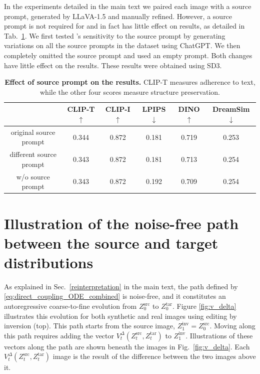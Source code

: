 In the experiments detailed in the main text we paired each image with a source prompt, generated by LLaVA-1.5 and manually refined. However, a source prompt is not required for \ours{} and in fact has little effect on \ours{} results, as detailed in Tab.~\ref{tab:src_prompt}. 
We first tested \ours{}'s sensitivity to the source prompt by generating variations on all the source prompts in the dataset using ChatGPT. We then completely omitted the source prompt and used an empty prompt. Both changes have little effect on the results. These results were obtained using SD3. 

\begin{table}[h]
\centering
\caption{\textbf{Effect of source prompt on the results.} CLIP-T measures adherence to text, while the other four scores measure structure preservation.}
\label{tab:src_prompt}
\begin{tabular}{@{}c|c|cccc@{}}
\toprule
 & CLIP-T $\uparrow$ & CLIP-I $\uparrow$ & LPIPS $\downarrow$ & DINO $\uparrow$ & DreamSim $\downarrow$ \\ \midrule
original source prompt & 0.344 & 0.872 & 0.181 & 0.719 & 0.253 \\
\midrule
different source prompt & 0.343 & 0.872 & 0.181 & 0.713 & 0.254  \\
w/o source prompt & 0.343 & 0.872 & 0.192 & 0.709 & 0.254 \\
\bottomrule
\end{tabular}
\end{table}

\clearpage
\section{Illustration of the noise-free path between the source and target distributions}
\label{sm:v_delta}

As explained in Sec.~\ref{reinterpretation} in the main text, the path defined by \eqref{eq:direct_coupling_ODE_combined} is noise-free, and it constitutes an autoregressive coarse-to-fine evolution from $Z^{\text{src}}_0$ to $Z^{\text{tar}}_0$. Figure \ref{fig:v_delta} illustrates this evolution for both synthetic and real images using editing by inversion (top). This path starts from the source image, $Z_1^{\text{inv}}=Z^{\text{src}}_0$. Moving along this path requires adding the vector $V^{\Delta}_{t}(Z^{\text{src}}_{t},Z^{\text{tar}}_{t})$ to $Z_1^{\text{inv}}$. Illustrations of these vectors along the path are shown beneath the images in Fig.~\ref{fig:v_delta}. Each $V^{\Delta}_{t}(Z^{\text{src}}_{t},Z^{\text{tar}}_{t})$ image is the result of the difference between the two images above it.

